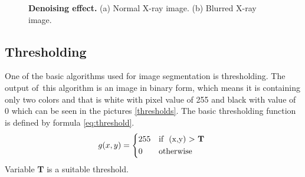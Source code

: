 \begin{figure}[!ht]
\begin{subfigure}[b]{.45\textwidth}
        \caption{}\label{denoised-img}
    \end{subfigure}
     \caption{\textbf{Denoising effect.} (a) Normal X-ray image. (b) Blurred X-ray image.}
    \label{denoised}
\end{figure}

\subsection{Thresholding}
\label{classic-thresh}
One of the basic algorithms used for image segmentation is thresholding. The output of~this algorithm is an image in binary form, which means it is containing only two colors and that is white with pixel value of 255 and black with value of 0 which can be seen in the pictures \ref{thresholds}. The basic thresholding function is defined by formula \ref{eq:threshold}.
\begin{equation}
    g(x,y)= 
\begin{dcases*}
    255 & \text{if } (x,y) > \textbf{T} \\
    0 & \text{otherwise}
\end{dcases*}
\label{eq:threshold}
\end{equation}   
Variable \textbf{T} is a suitable threshold.

